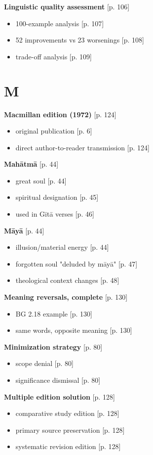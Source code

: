 \documentclass[11pt,twoside]{book}
\begin{document}
\textbf{\textbf{Linguistic quality assessment}} {[}p. 106]
\begin{itemize}
\item 100-example analysis [p. 107]
\item 52 improvements vs 23 worsenings [p. 108]
\item trade-off analysis [p. 109]
\end{itemize}
\section*{M}
\label{sec:orgdfcbae4}

\textbf{\textbf{Macmillan edition (1972)}} {[}p. 124]
\begin{itemize}
\item original publication [p. 6]
\item direct author-to-reader transmission [p. 124]
\end{itemize}

\textbf{\textbf{Mahātmā}} {[}p. 44]
\begin{itemize}
\item great soul [p. 44]
\item spiritual designation [p. 45]
\item used in Gītā verses [p. 46]
\end{itemize}

\textbf{\textbf{Māyā}} {[}p. 44]
\begin{itemize}
\item illusion/material energy [p. 44]
\item forgotten soul "deluded by māyā" [p. 47]
\item theological context changes [p. 48]
\end{itemize}

\textbf{\textbf{Meaning reversals, complete}} {[}p. 130]
\begin{itemize}
\item BG 2.18 example [p. 130]
\item same words, opposite meaning [p. 130]
\end{itemize}

\textbf{\textbf{Minimization strategy}} {[}p. 80]
\begin{itemize}
\item scope denial [p. 80]
\item significance dismissal [p. 80]
\end{itemize}

\textbf{\textbf{Multiple edition solution}} {[}p. 128]
\begin{itemize}
\item comparative study edition [p. 128]
\item primary source preservation [p. 128]
\item systematic revision edition [p. 128]
\end{itemize}
\end{document}
